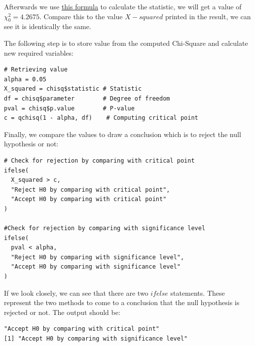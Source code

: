 \documentclass[a4paper]{article}
\numberwithin{equation}{section}
\begin{document}
Afterwards we use \hyperref[chi:stat]{\underline{this formula}} to calculate the statistic, we will get a value of \( \chi_0^2 = 4.2675\). Compare this to the value \( X-squared \) printed in the result, we can see it is identically the same.

The following step is to store value from the computed Chi-Square and calculate new required variables:
\begin{mdframed}[leftline=false,rightline=false,backgroundcolor=magenta!10,nobreak=true]
  \begin{verbatim}
# Retrieving value
alpha = 0.05
X_squared = chisq$statistic # Statistic
df = chisq$parameter        # Degree of freedom
pval = chisq$p.value        # P-value
c = qchisq(1 - alpha, df)    # Computing critical point
  \end{verbatim}
\end{mdframed}

Finally, we compare the values to draw a conclusion which is to reject the null hypothesis or not:
\begin{mdframed}[leftline=false,rightline=false,backgroundcolor=magenta!10,nobreak=true]
  \begin{verbatim}
# Check for rejection by comparing with critical point
ifelse(
  X_squared > c,
  "Reject H0 by comparing with critical point",
  "Accept H0 by comparing with critical point"
)

#Check for rejection by comparing with significance level
ifelse(
  pval < alpha,
  "Reject H0 by comparing with significance level",
  "Accept H0 by comparing with significance level"
)
  \end{verbatim}
\end{mdframed}

If we look closely, we can see that there are two \(ifelse\) statements. These represent the two methods to come to a conclusion that the null hypothesis is rejected or not. The output should be:
\begin{mdframed}[leftline=false,rightline=false,backgroundcolor=gray!10,nobreak=true]
  \begin{verbatim}
"Accept H0 by comparing with critical point"
[1] "Accept H0 by comparing with significance level"
  \end{verbatim}
\end{mdframed}
\end{document}
